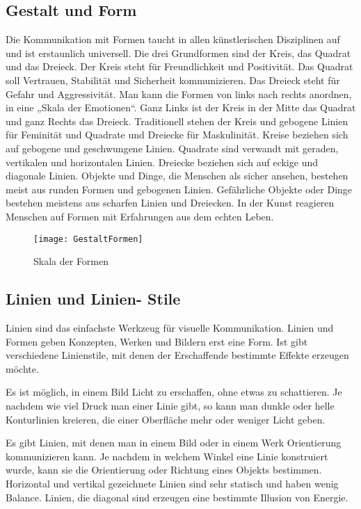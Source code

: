 \subsection{Gestalt und Form}
Die Kommunikation mit Formen taucht in allen künstlerischen Disziplinen auf und ist erstaunlich universell. Die drei Grundformen sind der Kreis, das Quadrat und das Dreieck. Der Kreis steht für Freundlichkeit und Positivität. Das Quadrat soll Vertrauen, Stabilität und Sicherheit kommunizieren. Das Dreieck steht für Gefahr und Aggressivität. Man kann die Formen von links nach rechts anordnen, in eine „Skala der Emotionen“. Ganz Links ist der Kreis in der Mitte das Quadrat und ganz Rechts das Dreieck. Traditionell stehen der Kreis und gebogene Linien für Feminität und Quadrate und Dreiecke für Maskulinität.
Kreise beziehen sich auf gebogene und geschwungene Linien. Quadrate sind verwandt mit geraden, vertikalen und horizontalen Linien. Dreiecke beziehen sich auf eckige und diagonale Linien. 
Objekte und Dinge, die Menschen als sicher ansehen, bestehen meist aus runden Formen und gebogenen Linien. Gefährliche Objekte oder Dinge bestehen meistens aus scharfen Linien und Dreiecken. In der Kunst reagieren Menschen auf Formen mit Erfahrungen aus dem echten Leben.
\cite{solarski2012drawing}

\begin{figure}[H]
	\centering
	\texttt{[image: GestaltFormen]}
	\caption{Skala der Formen\cite{solarski2012drawing}}
\end{figure}

\subsection{Linien und Linien- Stile}
Linien sind das einfachste Werkzeug für visuelle Kommunikation. Linien und Formen geben Konzepten, Werken und Bildern erst eine Form. Ist gibt verschiedene Linienstile, mit denen der Erschaffende bestimmte Effekte erzeugen möchte. 

Es ist möglich, in einem Bild Licht zu erschaffen, ohne etwas zu schattieren. Je nachdem wie viel Druck man einer Linie gibt, so kann man dunkle oder helle Konturlinien kreieren, die einer Oberfläche mehr oder weniger Licht geben. 

Es gibt Linien, mit denen man in einem Bild oder in einem Werk Orientierung kommunizieren kann. Je nachdem in welchem Winkel eine Linie konstruiert wurde, kann sie die Orientierung oder Richtung eines Objekts bestimmen. Horizontal und vertikal gezeichnete Linien sind sehr statisch und haben wenig Balance. Linien, die diagonal sind erzeugen eine bestimmte Illusion von Energie.

